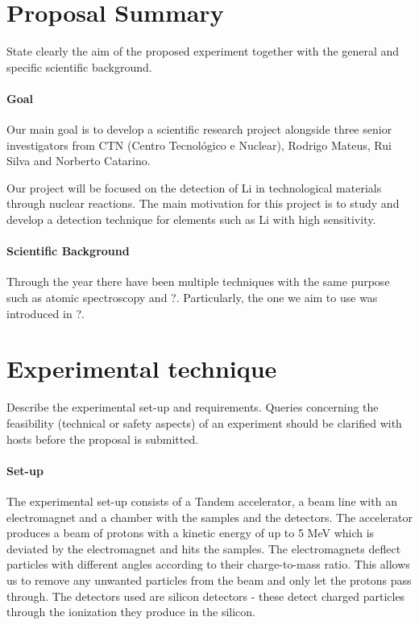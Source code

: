\documentclass{article}
\begin{document}
\begin{multicols}{2}


\section{Proposal Summary}

State clearly the aim of the proposed experiment together with the general and specific scientific background.

\paragraph{Goal}

Our main goal is to develop a scientific research project alongside three senior investigators from CTN
(Centro Tecnológico e Nuclear), Rodrigo Mateus, Rui Silva and Norberto Catarino. 

Our project will be focused on the detection of Li in technological materials through nuclear reactions.
The main motivation for this project is to study and develop a detection technique for elements such as Li with
high sensitivity.

\paragraph{Scientific Background}

Through the year there have been multiple techniques with the same purpose such as atomic spectroscopy and ?.
Particularly, the one we aim to use was introduced in ?.

\section{Experimental technique}

Describe the experimental set-up and requirements. Queries concerning the feasibility (technical or safety aspects) of
an experiment should be clarified with hosts before the proposal is submitted.

\paragraph{Set-up}

The experimental set-up consists of a Tandem accelerator, a beam line with an electromagnet and a chamber with the samples
and the detectors.
The accelerator produces a beam of protons with a kinetic energy of up to 5 MeV which is deviated by the electromagnet
and hits the samples. 
The electromagnets deflect particles with different angles according to their charge-to-mass ratio.
This allows us to remove any unwanted particles from the beam and only let the protons pass through.
The detectors used are silicon detectors - these detect charged particles through the ionization they produce in the
silicon.


\end{multicols}
\end{document}

